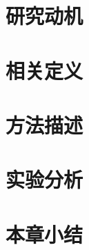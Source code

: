 \section{研究动机}
\label{sec3:motivation}

\section{相关定义}
\label{sec3:definition}

\section{方法描述}
\label{sec3:method}

\section{实验分析}
\label{sec3:experiment}

\section{本章小结}
\label{sec3:conclusion}